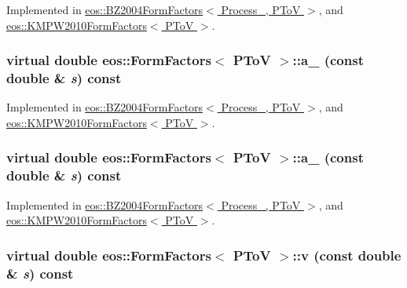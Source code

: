 Implemented in \hyperlink{classeos_1_1BZ2004FormFactors_3_01Process___00_01PToV_01_4_a790c3bda390cd45e32f9d99daf3d87e0}{eos::BZ2004FormFactors$<$ Process\_\-, PToV $>$}, and \hyperlink{classeos_1_1KMPW2010FormFactors_3_01PToV_01_4_a9ed6f27dc8847077c7a66d56e72ccec1}{eos::KMPW2010FormFactors$<$ PToV $>$}.\hypertarget{classeos_1_1FormFactors_3_01PToV_01_4_aba4400dbd92741ee82eb759c62a28fa9}{
\subsubsection[{a\_\-12}]{\setlength{\rightskip}{0pt plus 5cm}virtual double eos::FormFactors$<$ {\bf PToV} $>$::a\_ (const double \& {\em s}) const}}
\label{classeos_1_1FormFactors_3_01PToV_01_4_aba4400dbd92741ee82eb759c62a28fa9}


Implemented in \hyperlink{classeos_1_1BZ2004FormFactors_3_01Process___00_01PToV_01_4_a2a5dd7b8b48e71efd26489622a10ed7f}{eos::BZ2004FormFactors$<$ Process\_\-, PToV $>$}, and \hyperlink{classeos_1_1KMPW2010FormFactors_3_01PToV_01_4_ab66c9cab243661f5fbabf76b42a060d4}{eos::KMPW2010FormFactors$<$ PToV $>$}.\hypertarget{classeos_1_1FormFactors_3_01PToV_01_4_adf8b5d0a879693460aa67feec257c959}{
\subsubsection[{a\_\-2}]{\setlength{\rightskip}{0pt plus 5cm}virtual double eos::FormFactors$<$ {\bf PToV} $>$::a\_ (const double \& {\em s}) const}}
\label{classeos_1_1FormFactors_3_01PToV_01_4_adf8b5d0a879693460aa67feec257c959}


Implemented in \hyperlink{classeos_1_1BZ2004FormFactors_3_01Process___00_01PToV_01_4_a772daa575ec65cac187fc0ec34364ddd}{eos::BZ2004FormFactors$<$ Process\_\-, PToV $>$}, and \hyperlink{classeos_1_1KMPW2010FormFactors_3_01PToV_01_4_a38d93dfcb8948cf55480fb40cddbb470}{eos::KMPW2010FormFactors$<$ PToV $>$}.\hypertarget{classeos_1_1FormFactors_3_01PToV_01_4_a1a76e6a00b424994b0b4eb86b4a8131f}{
\subsubsection[{v}]{\setlength{\rightskip}{0pt plus 5cm}virtual double eos::FormFactors$<$ {\bf PToV} $>$::v (const double \& {\em s}) const}}
\label{classeos_1_1FormFactors_3_01PToV_01_4_a1a76e6a00b424994b0b4eb86b4a8131f}


